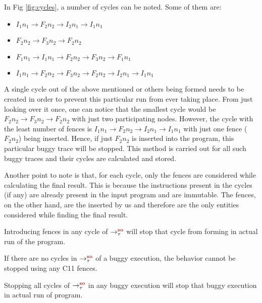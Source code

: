 \par
In Fig \ref{fig:cycles}, a number of cycles can be noted. Some of them are:
\begin{itemize}
\item \textit{$I_1n_1 \rightarrow F_2n_2 \rightarrow I_2n_1 \rightarrow I_1n_1$}
\item \textit{$F_2n_2 \rightarrow F_3n_2 \rightarrow F_2n_2$}
\item \textit{$F_1n_1 \rightarrow I_1n_1 \rightarrow F_2n_2 \rightarrow F_3n_2 \rightarrow F_1n_1$}
\item \textit{$I_1n_1 \rightarrow F_2n_2 \rightarrow F_3n_2 \rightarrow F_2n_2 \rightarrow I_2n_1 \rightarrow I_1n_1$}
\end{itemize} 
A single cycle out of the above mentioned or others being formed needs 
to be created in order to prevent this particular run from ever taking 
place. From just looking over it once, one can notice that the smallest 
cycle would be \textit{$F_2n_2 \rightarrow F_3n_2 \rightarrow F_2n_2$} 
with just two participating nodes. However, the cycle with the least 
number of fences is \textit{$I_1n_1 \rightarrow F_2n_2 \rightarrow I_2n_1 
\rightarrow I_1n_1$} with just one fence (\textit{$F_2n_2$}) being inserted. 
Hence, if just \textit{$F_2n_2$} is inserted into the program, this particular 
buggy trace will be stopped. This method is carried out for all such 
buggy traces and their cycles are calculated and stored.

Another point to note is that, for each cycle, only the fences are considered
while calculating the final result. This is because the instructions present in the
cycles (if any) are already present in the input program and are immutable.
The fences, on the other hand, are the inserted by us and therefore are the only
entities considered while finding the final result.


\begin{lemma}
	Introducing fences in any cycle of $\setSO$ will stop that cycle 
	from forming in actual run of the program.
\end{lemma}

\begin{lemma}
	If there are no cycles in $\setSO$ of a buggy execution, the behavior 
	cannot be stopped using any C11 fences.
\end{lemma}

\begin{theorem}
	Stopping all cycles of $\setSO$ in any buggy execution will stop that
	buggy execution in actual run of program.
\end{theorem}

